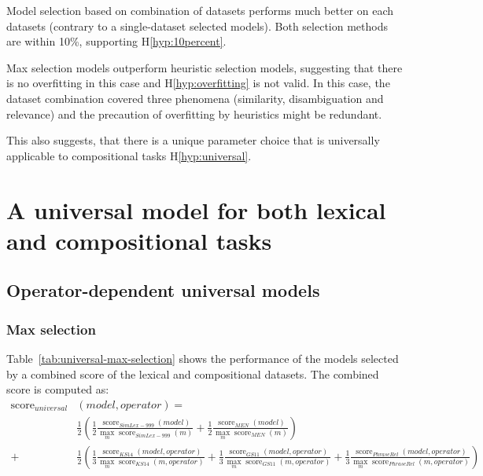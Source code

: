 Model selection based on combination of datasets performs much better on each datasets (contrary to a single-dataset selected models). Both selection methods are within 10\%, supporting H\ref{hyp:10percent}.

Max selection models outperform heuristic selection models, suggesting that there is no overfitting in this case and H\ref{hyp:overfitting} is not valid. In this case, the dataset combination covered three phenomena (similarity, disambiguation and relevance) and the precaution of overfitting by heuristics might be redundant.

This also suggests, that there is a unique parameter choice that is universally applicable to compositional tasks H\ref{hyp:universal}.

\chapter[Universal model]{A universal model for both lexical and compositional tasks}
\label{sec:universal-param-selection}

\section{Operator-dependent universal models}
\label{sec:model-selection}

\subsection{Max selection}
\label{sec:max-selection-universal}

Table~\ref{tab:universal-max-selection} shows the performance of the models selected by a combined score of the lexical and compositional datasets. The combined score is computed as:
%
\scriptsize
\begin{align*}
\operatorname{score}_\mathit{universal}&(\mathit{model}, \mathit{operator}) =\\%
& \frac{1}{2}\left(
\frac{1}{2}%
\frac{\operatorname{score}_\mathit{SimLex-999}(\mathit{model})}%
{\max_m\operatorname{score}_\mathit{SimLex-999}(m)}%
+%
\frac{1}{2}%
\frac{\operatorname{score}_\mathit{MEN}(\mathit{model})}%
{\max_m\operatorname{score}_\mathit{MEN}(m)}%
\right)
\\
+&\frac{1}{2}\left(
\frac{1}{3}%
\frac{\operatorname{score}_\mathit{KS14}(\mathit{model}, \mathit{operator})}%
{\max_m\operatorname{score}_\mathit{KS14}(m, \mathit{operator})}%
+%
\frac{1}{3}%
\frac{\operatorname{score}_\mathit{GS11}(\mathit{model}, \mathit{operator})}%
{\max_m\operatorname{score}_\mathit{GS11}(m, \mathit{operator})}%
+%
\frac{1}{3}%
\frac{\operatorname{score}_\mathit{PhraseRel}(\mathit{model, \mathit{operator}})}%
{\max_m\operatorname{score}_\mathit{PhraseRel}(m, \mathit{operator})}%
\right)
\end{align*}
\normalsize


